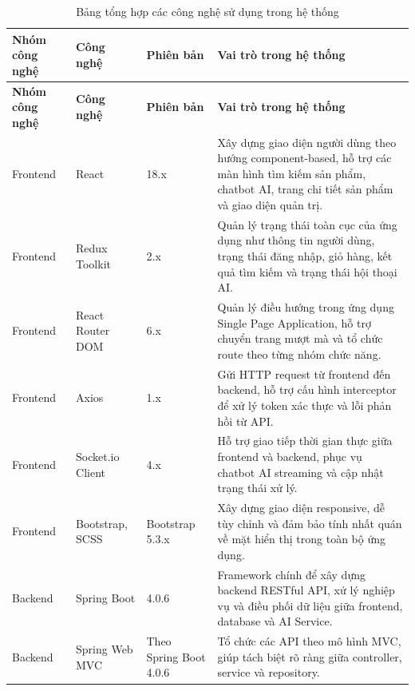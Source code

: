 \begin{longtable}{|p{2.6cm}|p{3.1cm}|p{2.4cm}|p{6.3cm}|}
\caption{Bảng tổng hợp các công nghệ sử dụng trong hệ thống} \\
\hline
\textbf{Nhóm công nghệ} & \textbf{Công nghệ} & \textbf{Phiên bản} & \textbf{Vai trò trong hệ thống} \\
\hline
\endfirsthead

\hline
\textbf{Nhóm công nghệ} & \textbf{Công nghệ} & \textbf{Phiên bản} & \textbf{Vai trò trong hệ thống} \\
\hline
\endhead

Frontend 
& React 
& 18.x
& Xây dựng giao diện người dùng theo hướng component-based, hỗ trợ các màn hình tìm kiếm sản phẩm, chatbot AI, trang chi tiết sản phẩm và giao diện quản trị. \\
\hline

Frontend 
& Redux Toolkit 
& 2.x
& Quản lý trạng thái toàn cục của ứng dụng như thông tin người dùng, trạng thái đăng nhập, giỏ hàng, kết quả tìm kiếm và trạng thái hội thoại AI. \\
\hline

Frontend 
& React Router DOM 
& 6.x
& Quản lý điều hướng trong ứng dụng Single Page Application, hỗ trợ chuyển trang mượt mà và tổ chức route theo từng nhóm chức năng. \\
\hline

Frontend 
& Axios 
& 1.x
& Gửi HTTP request từ frontend đến backend, hỗ trợ cấu hình interceptor để xử lý token xác thực và lỗi phản hồi từ API. \\
\hline

Frontend 
& Socket.io Client 
& 4.x
& Hỗ trợ giao tiếp thời gian thực giữa frontend và backend, phục vụ chatbot AI streaming và cập nhật trạng thái xử lý. \\
\hline

Frontend 
& Bootstrap, SCSS 
& Bootstrap 5.3.x
& Xây dựng giao diện responsive, dễ tùy chỉnh và đảm bảo tính nhất quán về mặt hiển thị trong toàn bộ ứng dụng. \\
\hline

Backend 
& Spring Boot 
& 4.0.6
& Framework chính để xây dựng backend RESTful API, xử lý nghiệp vụ và điều phối dữ liệu giữa frontend, database và AI Service. \\
\hline

Backend 
& Spring Web MVC 
& Theo Spring Boot 4.0.6
& Tổ chức các API theo mô hình MVC, giúp tách biệt rõ ràng giữa controller, service và repository. \\
\hline


\end{longtable}
